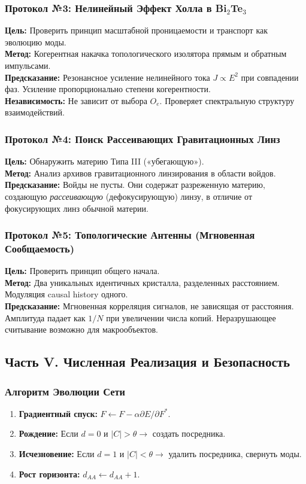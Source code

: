 \documentclass[12pt,a4paper]{article}
\begin{document}
\subsubsection{Протокол №3: Нелинейный Эффект Холла в Bi$_2$Te$_3$}
\textbf{Цель:} Проверить принцип масштабной проницаемости и транспорт как эволюцию моды.\\
\textbf{Метод:} Когерентная накачка топологического изолятора прямым и обратным импульсами.\\
\textbf{Предсказание:} Резонансное усиление нелинейного тока $J \propto E^2$ при совпадении фаз. Усиление пропорционально степени когерентности.\\
\textbf{Независимость:} Не зависит от выбора $O_e$. Проверяет спектральную структуру взаимодействий.

\subsubsection{Протокол №4: Поиск Рассеивающих Гравитационных Линз}
\textbf{Цель:} Обнаружить материю Типа III («убегающую»).\\
\textbf{Метод:} Анализ архивов гравитационного линзирования в области войдов.\\
\textbf{Предсказание:} Войды не пусты. Они содержат разреженную материю, создающую \textit{рассеивающую} (дефокусирующую) линзу, в отличие от фокусирующих линз обычной материи.

\subsubsection{Протокол №5: Топологические Антенны (Мгновенная Сообщаемость)}
\textbf{Цель:} Проверить принцип общего начала.\\
\textbf{Метод:} Два уникальных идентичных кристалла, разделенных расстоянием. Модуляция causal history одного.\\
\textbf{Предсказание:} Мгновенная корреляция сигналов, не зависящая от расстояния. Амплитуда падает как $1/N$ при увеличении числа копий. Неразрушающее считывание возможно для макрообъектов.

\subsection{Часть V. Численная Реализация и Безопасность}

\subsubsection{Алгоритм Эволюции Сети}
\begin{enumerate}
    \item \textbf{Градиентный спуск:} $F \leftarrow F - \alpha \partial E / \partial F^*$.
    \item \textbf{Рождение:} Если $d=0$ и $|C| > \theta \to$ создать посредника.
    \item \textbf{Исчезновение:} Если $d=1$ и $|C| < \theta \to$ удалить посредника, свернуть моды.
    \item \textbf{Рост горизонта:} $d_{AA} \leftarrow d_{AA} + 1$.
\end{enumerate}
\end{document}

